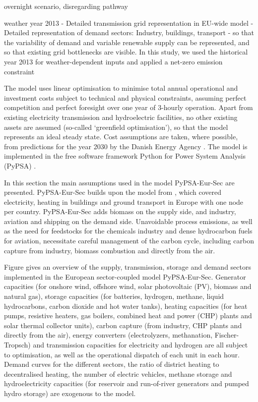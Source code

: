 overnight scenario, disregarding pathway

weather year 2013
- Detailed transmission grid representation in EU-wide model
- Detailed representation of demand sectors: Industry, buildings, transport
- so that the variability of demand and variable renewable supply can be represented, and so that existing grid bottlenecks are visible.
In this study, we used the historical year 2013 for weather-dependent inputs and applied a net-zero
emission constraint

The model uses linear optimisation to minimise total annual operational and
investment costs subject to technical and physical constraints, assuming perfect
competition and perfect foresight over one year of 3-hourly operation. Apart
from existing electricity transmission and hydroelectric facilities, no other
existing assets are assumed (so-called `greenfield optimisation'), so that the
model represents an ideal steady state.  Cost assumptions are taken, where
possible, from predictions for the year 2030 by the Danish Energy Agency
\cite{dea2019}. The model is implemented in the free software framework Python
for Power System Analysis (PyPSA) \cite{brownPyPSAPython2018}.

In this section the main assumptions used in the model PyPSA-Eur-Sec are
presented. PyPSA-Eur-Sec builds upon the model from \cite{brown2018}, which
covered electricity, heating in buildings and ground transport in Europe with
one node per country. PyPSA-Eur-Sec adds biomass on the supply side, and
industry, aviation and shipping on the demand side. Unavoidable process
emissions, as well as the need for feedstocks for the chemicals industry and
dense hydrocarbon fuels for aviation, necessitate careful management of the
carbon cycle, including carbon capture from industry, biomass combustion and
directly from the air.

Figure gives an overview of the supply, transmission,
storage and demand sectors implemented in the European sector-coupled model
PyPSA-Eur-Sec. Generator capacities (for onshore wind, offshore wind, solar
photovoltaic (PV), biomass and natural gas), storage capacities (for batteries,
hydrogen, methane, liquid hydrocarbons, carbon dioxide and hot water tanks),
heating capacities (for heat pumps, resistive heaters, gas boilers, combined
heat and power (CHP) plants and solar thermal collector units), carbon capture
(from industry, CHP plants and directly from the air), energy converters
(electrolyzers, methanation, Fischer-Tropsch) and transmission capacities for
electricity and hydrogen are all subject to optimisation, as well as the
operational dispatch of each unit in each hour. Demand curves for the different
sectors, the ratio of district heating to decentralised heating, the number of
electric vehicles, methane storage and hydroelectricity capacities (for
reservoir and run-of-river generators and pumped hydro storage) are exogenous to
the model.

